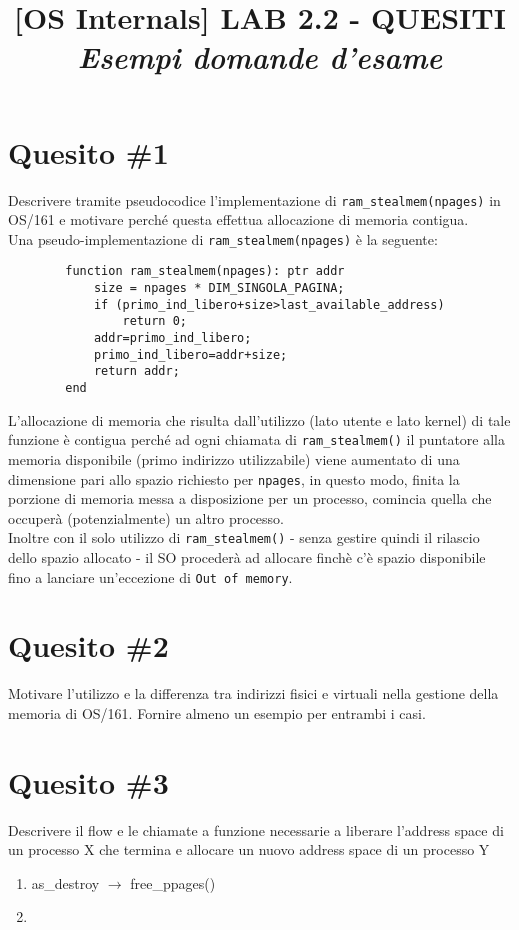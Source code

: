 \documentclass[12pt]{article}
\title{\vspace{-1cm}
\textbf{[OS Internals] LAB 2.2 - QUESITI}\\ 
\vspace{0.3cm}
\small{\textit{Esempi domande d'esame}}}
\author{}
\date{}
\begin{document}
    \maketitle

    \section*{Quesito \#1}
    {\color{blue}
    Descrivere tramite pseudocodice l'implementazione di \texttt{ram\_stealmem(npages)} in OS/161 e motivare perch\'e questa effettua allocazione di memoria contigua. 
    }\\
    
    \noindent
    Una pseudo-implementazione di \texttt{ram\_stealmem(npages)} \`e la seguente: 
    \begin{verbatim}
        function ram_stealmem(npages): ptr addr
            size = npages * DIM_SINGOLA_PAGINA;
            if (primo_ind_libero+size>last_available_address)
                return 0;
            addr=primo_ind_libero; 
            primo_ind_libero=addr+size;
            return addr; 
        end
    \end{verbatim}
    L'allocazione di memoria che risulta dall'utilizzo (lato utente e lato kernel) di tale funzione \`e contigua perch\'e ad ogni chiamata di \texttt{ram\_stealmem()} il puntatore alla memoria disponibile (primo indirizzo utilizzabile) viene aumentato di una dimensione pari allo spazio richiesto per \texttt{npages}, in questo modo, finita la porzione di memoria messa a disposizione per un processo, comincia quella che occuper\`a (potenzialmente) un altro processo.\\
    Inoltre con il solo utilizzo di \texttt{ram\_stealmem()} - senza gestire quindi il rilascio dello spazio allocato - il SO proceder\`a ad allocare finch\`e c'\`e spazio disponibile fino a lanciare un'eccezione di \texttt{Out of memory}.    

    \section*{Quesito \#2}
    {\color{blue}
    Motivare l'utilizzo e la differenza tra indirizzi fisici e virtuali nella gestione della memoria di OS/161. Fornire almeno un esempio per entrambi i casi.
    }
    

    \section*{Quesito \#3}
    {\color{blue}
     Descrivere il flow e le chiamate a funzione necessarie a liberare l'address space di un processo X che termina e allocare un nuovo address space di un processo Y
    }

    \begin{enumerate}
        \item as\_destroy $\to$ free\_ppages()
        \item 
    \end{enumerate}
   

    
    
\end{document}
